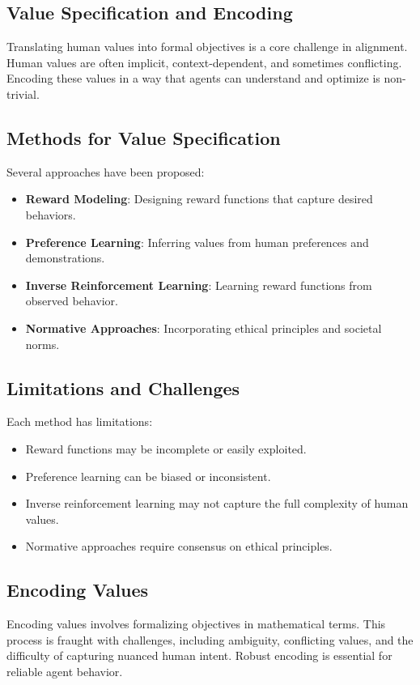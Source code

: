 \begin{TNtwocol}
\section{Value Specification and Encoding}
Translating human values into formal objectives is a core challenge in alignment. Human values are often implicit, context-dependent, and sometimes conflicting. Encoding these values in a way that agents can understand and optimize is non-trivial.

\subsection{Methods for Value Specification}
Several approaches have been proposed:
\begin{itemize}
    \item \textbf{Reward Modeling}: Designing reward functions that capture desired behaviors.
    \item \textbf{Preference Learning}: Inferring values from human preferences and demonstrations.
    \item \textbf{Inverse Reinforcement Learning}: Learning reward functions from observed behavior.
    \item \textbf{Normative Approaches}: Incorporating ethical principles and societal norms.
\end{itemize}

\subsection{Limitations and Challenges}
Each method has limitations:
\begin{itemize}
    \item Reward functions may be incomplete or easily exploited.
    \item Preference learning can be biased or inconsistent.
    \item Inverse reinforcement learning may not capture the full complexity of human values.
    \item Normative approaches require consensus on ethical principles.
\end{itemize}

\subsection{Encoding Values}
Encoding values involves formalizing objectives in mathematical terms. This process is fraught with challenges, including ambiguity, conflicting values, and the difficulty of capturing nuanced human intent. Robust encoding is essential for reliable agent behavior.


\end{TNtwocol}
